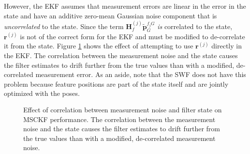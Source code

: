 \documentclass[letterpaper, 10 pt, conference]{ieeeconf}  %
\def\Vec#1{\mathbf{#1}}
\begin{document}
However, the EKF assumes that measurement errors are linear in the error in the state and have an additive zero-mean Gaussian noise component that is \textit{uncorrelated} to the state.
Since the term $\Vec{H}_{f}^{(j)} \widetilde{\Vec{p}}_G^{f_j G}$ \textit{is} correlated to the state, $\Vec{r}^{(j)}$ is not of the correct form for the EKF and must be modified to de-correlate it from the state.
Figure \ref{fig:nullspace} shows the effect of attempting to use $\Vec{r}^{(j)}$ directly in the EKF.
The correlation between the measurement noise and the state causes the filter estimates to drift further from the true values than with a modified, de-correlated measurement error.
As an aside, note that the SWF does not have this problem because feature positions are part of the state itself and are jointly optimized with the poses.

\begin{figure}
    \centering

    
    \caption{Effect of correlation between measurement noise and filter state on MSCKF performance. The correlation between the measurement noise and the state causes the filter estimates to drift further from the true values than with a modified, de-correlated measurement noise.}
    \label{fig:nullspace}
\end{figure}
\end{document}

